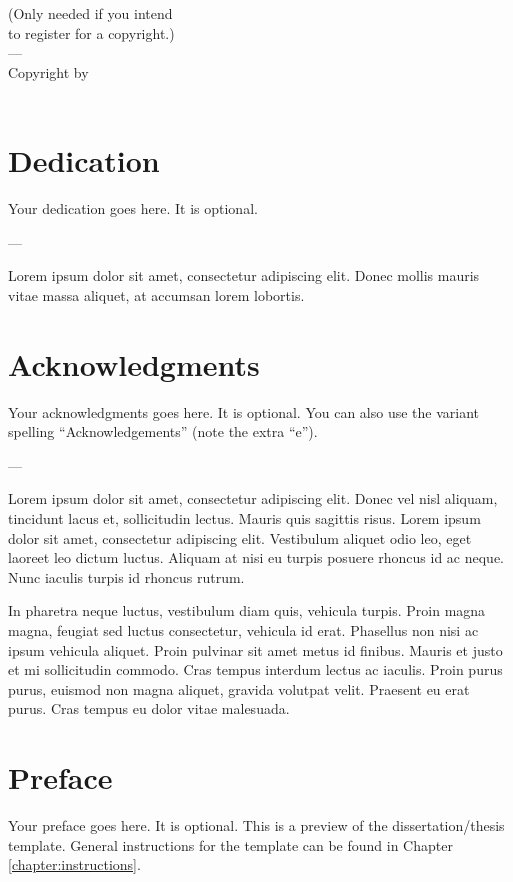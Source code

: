 \documentclass[dissertation]{msudissertation}
\begin{document}
(Only needed if you intend \\
to register for a copyright.)
\\
---
\\
Copyright by \\
\MakeUppercase{\theauthor} \\
\thedate

\chapter{Dedication}

Your dedication goes here.  It is optional.

---

Lorem ipsum dolor sit amet, consectetur adipiscing elit. Donec mollis mauris vitae massa aliquet, at accumsan lorem lobortis.

\chapter{Acknowledgments}

Your acknowledgments goes here.  It is optional.  You can also use the variant spelling ``Acknowledgements'' (note the extra ``e'').

---

Lorem ipsum dolor sit amet, consectetur adipiscing elit. Donec vel nisl aliquam, tincidunt lacus et, sollicitudin lectus. Mauris quis sagittis risus. Lorem ipsum dolor sit amet, consectetur adipiscing elit. Vestibulum aliquet odio leo, eget laoreet leo dictum luctus. Aliquam at nisi eu turpis posuere rhoncus id ac neque. Nunc iaculis turpis id rhoncus rutrum.

In pharetra neque luctus, vestibulum diam quis, vehicula turpis. Proin magna magna, feugiat sed luctus consectetur, vehicula id erat. Phasellus non nisi ac ipsum vehicula aliquet. Proin pulvinar sit amet metus id finibus. Mauris et justo et mi sollicitudin commodo. Cras tempus interdum lectus ac iaculis. Proin purus purus, euismod non magna aliquet, gravida volutpat velit. Praesent eu erat purus. Cras tempus eu dolor vitae malesuada.

\chapter{Preface}

Your preface goes here.  It is optional.  This is a preview of the dissertation/thesis template.  General instructions for the template can be found in Chapter \ref{chapter:instructions}.
\end{document}
